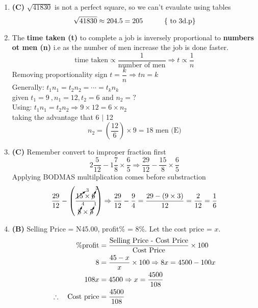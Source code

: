 \begin{multicols}{2}
\begin{enumerate}[label={\arabic*.}]
    \item \textbf{(C) } $ \sqrt{41830}$ is not a perfect square, so we can't evaulate using tables
    \[ \sqrt{41830} \approx 204.5 = 205 \hspace{30px} \text{\{ to 3d.p\}}\]
    \item The \textbf{time taken (t)} to complete a job is inversely proportional to \textbf{numbers ot men (n)} 
    i.e as the number of men increase the job is done faster. 
        \begin{equation}
            \text{time taken} \propto \dfrac{1}{\text{number of men}} \Rightarrow t \propto \dfrac{1}{n} 
        \end{equation}
    Removing proportionality sign
    \(t = \dfrac{k}{n} \Rightarrow tn = k\) \\
    Generally:  \hspace{10px}\(t_{1}n_{1} = t_{2}n_2 = \cdots = t_{k}n_{k}\)\\
    given \(t_{1} = 9\ , n_{1} = 12 , t_{2} = 6 \text{ and } n_{2} = ?\) \\
    Using: \(t_{1}n_{1} = t_{2}n_{2} \Rightarrow 9 \times 12 = 6 \times n_{2}\) \\
    taking the advantage that 6 $\mid$ 12 
    \[n_{2} = \left(\frac{12}{6}\right) \times 9 = 18 \text { men (E)}\]

    \item \textbf{(C)} Remember convert to improper fraction first
    \[2\frac{5}{12} - 1\frac{7}{8} \times \frac{6}{5} \Rightarrow \frac{29}{12} - \frac{15}{8} \times \frac{6}{5}\]
    Applying BODMAS multilplication comes before substraction\\
    \[\dfrac{29}{12} - \left(\dfrac{\cancelto{3}{15} \times \cancelto{3}{6}}{\cancelto{4}{8} \times \cancelto{1}{5}}\right) \Rightarrow \dfrac{29}{12} - \dfrac{9}{4} = \dfrac{29 - (9 \times 3)}{12} = \frac{2}{12} = \frac{1}{6}\]

    \item \textbf{(B)} Selling Price = N45.00, profit\% = 8\%.
    Let the cost price = \(x\).
    \begin{align*}
    \%\text{profit} &= \frac{\text{Selling Price - Cost Price}}{\text{Cost Price}} \times 100 \\
    8 &= \frac{45 - x}{x} \times 100 \Rightarrow 8x = 4500 - 100x \\
    108x &= 4500 \Rightarrow x = \dfrac{4500}{108} \\
    \therefore \hspace{10px} \text{Cost price} &= \dfrac{4500}{108}
    \end{align*}
    

\end{enumerate}
\end{multicols}
